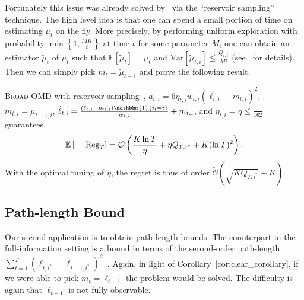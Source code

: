 \documentclass[final, 12pt]{colt2018} %
\newcommand{\reg}{\text{\rm Reg}}
\begin{document}
Fortunately this issue was already solved by~\citet{hazan2011better} via the ``reservoir sampling'' technique. 
The high level idea is that one can spend a small portion of time on estimating $\mu_{t}$ on the fly. More precisely, by performing uniform exploration with probability $\min\left\{1, \frac{MK}{t}\right\}$ at time $t$ for some parameter $M$, one can obtain an estimator $\tilde{\mu}_{t}$ of $\mu_t$  such that $\mathbb{E}[\tilde{\mu}_{t}] = \mu_{t}$ and $\text{Var}[\tilde{\mu}_{t,i}]\leq \frac{Q_{t,i}}{Mt}$ (see~\citep{hazan2011better} for details). 
Then we can simply pick $m_t=\tilde{\mu}_{t-1}$ %
and prove the following result.
\begin{theorem}
\label{cor:variance_bound}
\textsc{Broad-OMD} with reservoir sampling~\citep{hazan2011better}, $a_{t,i}=6\eta_{t,i}w_{t,i}(\hat{\ell}_{t,i}-m_{t,i})^2$, $m_{t,i}=\tilde{\mu}_{t-1,i}$, $\hat{\ell}_{t,i}=\frac{(\ell_{t,i}-m_{t,i})\mathbbm{1}\{i_t=i\}}{w_{t,i}}+m_{t,i}$, and $\eta_{t,i}=\eta\leq \frac{1}{162}$ guarantees
\begin{align*}
\mathbb{E}\left[\reg_T\right]= \mathcal{O}\left(\frac{K\ln T}{\eta}+\eta Q_{T,i^*} + K(\ln T)^2\right).
\end{align*}
With the optimal tuning of $\eta$, the regret is thus of order $\tilde{\mathcal{O}}\left(\sqrt{KQ_{T,i^*}}+K\right)$.
\end{theorem}

\subsection{Path-length Bound}
\label{subsubsection:path-length}

Our second application is to obtain path-length bounds.
The counterpart in the full-information setting is a bound in terms of the second-order path-length $\sum_{t=1}^T(\ell_{t,i^*}-\ell_{t-1,i^*})^2$~\citep{steinhardt2014adaptivity}. 
Again, in light of Corollary~\ref{cor:clear_corollary}, if we were able to pick $m_t = \ell_{t-1}$ the problem would be solved.
The difficulty is again that $\ell_{t-1}$ is not fully observable.

\end{document}
